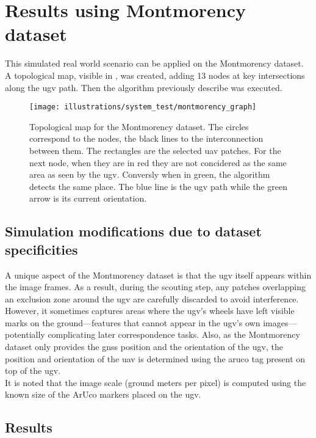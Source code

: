 \section{Results using Montmorency dataset}

This simulated real world scenario can be applied on the Montmorency dataset.
A topological map, visible in , was created, adding 13 nodes at key intersections
along the \gls{ugv} path.
Then the algorithm previously describe was executed.


\begin{figure}[ht!]
    \centering
    \texttt{[image: illustrations/system\_test/montmorency\_graph]}
    \caption{Topological map for the Montmorency dataset. The circles correspond to the nodes, the black lines to the
    interconnection between them. The rectangles are the selected \gls{uav} patches. For the next node, when they are
    in red they are not concidered as the same area as seen by the \gls{ugv}. Conversly when in green, the algorithm
    detects the same place. The blue line is the \gls{ugv} path while the green arrow is its current orientation.}
    \label{fig:system_test:montmorency:graph}
\end{figure}

\subsection{Simulation modifications due to dataset specificities}

A unique aspect of the Montmorency dataset is that the \gls{ugv} itself appears within the image frames.
As a result, during the scouting step, any patches overlapping an exclusion zone around the \gls{ugv} are carefully discarded to avoid interference.
However, it sometimes captures areas where the \gls{ugv}'s wheels have left visible marks on the ground---features that cannot appear in the \gls{ugv}'s own
images---potentially complicating later correspondence tasks.
Also, as the Montmorency dataset only provides the \gls{gnss} position and the orientation of the \gls{ugv},
the position and orientation of the \gls{uav} is determined using the aruco tag present on top of the \gls{ugv}.\\
It is noted that the image scale (ground meters per pixel) is computed using the known size of the ArUco markers placed on the \gls{ugv}.

\subsection{Results}

